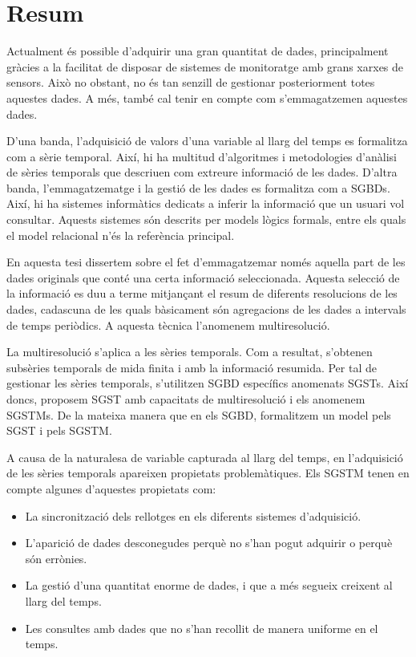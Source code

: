 \chapter*{Resum}


Actualment és possible d'adquirir una gran quantitat de dades,
principalment gràcies a la facilitat de disposar de sistemes de
monitoratge amb grans xarxes de sensors. Això no obstant, no és tan
senzill de gestionar posteriorment totes aquestes dades.  A més, també
cal tenir en compte com s'emmagatzemen aquestes dades.


D'una banda, l'adquisició de valors d'una variable al llarg del temps
es formalitza com a sèrie temporal. Així, hi ha multitud d'algoritmes
i metodologies d'anàlisi de sèries temporals que descriuen com
extreure informació de les dades. D'altra banda, l'emmagatzematge i la
gestió de les dades es formalitza com a \glspl{SGBD}. Així, hi ha
sistemes informàtics dedicats a inferir la informació que un usuari
vol consultar. Aquests sistemes són descrits per models lògics
formals, entre els quals el model relacional n'és la referència
principal.


En aquesta tesi dissertem sobre el fet d'emmagatzemar només aquella
part de les dades originals que conté una certa informació
seleccionada. Aquesta selecció de la informació es duu a terme
mitjançant el resum de diferents resolucions de les dades, cadascuna
de les quals bàsicament són agregacions de les dades a intervals de
temps periòdics. A aquesta tècnica l'anomenem multiresolució.



La multiresolució s'aplica a les sèries temporals. Com a resultat,
s'obtenen subsèries temporals de mida finita i amb la informació
resumida. Per tal de gestionar les sèries temporals, s'utilitzen
\gls{SGBD} específics anomenats \glspl{SGST}. Així doncs, proposem
\gls{SGST} amb capacitats de multiresolució i els anomenem
\glspl{SGSTM}. De la mateixa manera que en els \gls{SGBD}, formalitzem
un model pels \gls{SGST} i pels \gls{SGSTM}.



A causa de la naturalesa de variable capturada al llarg del temps, en
l'adquisició de les sèries temporals apareixen propietats
problemàtiques. Els \gls{SGSTM} tenen en compte algunes d'aquestes
propietats com:
\begin{itemize}
\item La sincronització dels rellotges en els diferents sistemes
  d'adquisició.
\item L'aparició de dades desconegudes perquè no s'han pogut adquirir
  o perquè són errònies.
\item La gestió d'una quantitat enorme de dades, i que a més segueix
  creixent al llarg del temps.
\item Les consultes amb dades que no s'han recollit de manera uniforme
  en el temps.
\end{itemize}


